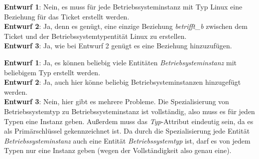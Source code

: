 \documentclass[a4paper,11pt]{article}             %
\begin{document}
\setcounter{excnt}{11}
\begin{ex}
\begin{exlist}
  \leavevmode
  \item
  \textbf{Entwurf 1}: Nein, es muss für jede Betriebssysteminstanz mit Typ Linux eine Beziehung für das Ticket erstellt werden. \\
\textbf{Entwurf 2}:  Ja, denn es genügt, eine einzige Beziehung \emph{betrifft\_b} zwischen dem Ticket und der Betriebssystemtypentität Linux zu erstellen. \\
\textbf{Entwurf 3}: Ja, wie bei Entwurf 2 genügt es eine Beziehung hinzuzufügen. 
\item
\textbf{Entwurf 1}: Ja, es können beliebig viele Entitäten
\textit{Betriebsysteminstanz} mit beliebigem Typ erstellt werden. \\
\textbf{Entwurf 2}: Ja, auch hier könne beliebig Betriebsysteminstanzen
hinzugefügt werden. \\
\textbf{Entwurf 3}: Nein, hier gibt es mehrere Probleme. Die Spezialisierung von
Betriebssystemtyp zu Betriebssysteminstanz ist vollständig, also muss es für
jeden Typen eine Instanz geben. Außerdem muss das \emph{Typ}-Attribut eindeutig
sein, da es als Primärschlüssel gekennzeichnet ist. Da durch die Spezialisierung
jede Entität \emph{Betriebssysteminstanz} auch eine Entität \emph{Betriebssystemtyp}
ist, darf es von jedem Typen nur eine Instanz geben (wegen der Vollständigkeit
also genau eine).
\end{exlist}
\end{ex}
\end{document}
